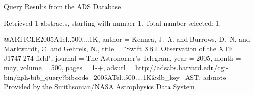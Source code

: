 Query Results from the ADS Database


Retrieved 1 abstracts, starting with number 1.  Total number selected: 1.

@ARTICLE{2005ATel..500....1K,
   author = {{Kennea}, J.~A. and {Burrows}, D.~N. and {Markwardt}, C. and 
	{Gehrels}, N.},
    title = "{Swift XRT Observation of the XTE J1747-274 field}",
  journal = {The Astronomer's Telegram},
     year = 2005,
    month = may,
   volume = 500,
    pages = {1-+},
   adsurl = {http://adsabs.harvard.edu/cgi-bin/nph-bib_query?bibcode=2005ATel..500....1K&db_key=AST},
  adsnote = {Provided by the Smithsonian/NASA Astrophysics Data System}
}


